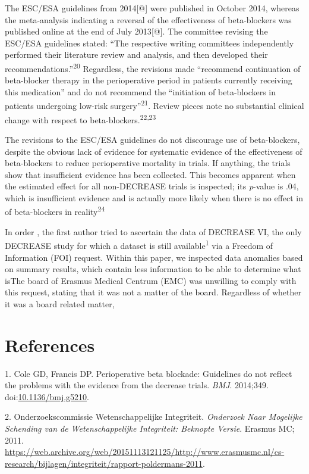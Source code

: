 \documentclass[]{article}
\begin{document}
The ESC/ESA guidelines from 2014{[}@{]} were published in October 2014,
whereas the meta-analysis indicating a reversal of the effectiveness of
beta-blockers was published online at the end of July 2013{[}@{]}. The
committee revising the ESC/ESA guidelines stated: ``The respective
writing committees independently performed their literature review and
analysis, and then developed their
recommendations.''\textsuperscript{20} Regardless, the revisions made
``recommend continuation of beta-blocker therapy in the perioperative
period in patients currently receiving this medication'' and do not
recommend the ``initiation of beta-blockers in patients undergoing
low-risk surgery''\textsuperscript{21}. Review pieces note no
substantial clinical change with respect to
beta-blockers.\textsuperscript{22,23}

The revisions to the ESC/ESA guidelines do not discourage use of
beta-blockers, despite the obvious lack of evidence for systematic
evidence of the effectiveness of beta-blockers to reduce perioperative
mortality in trials. If anything, the trials show that insufficient
evidence has been collected. This becomes apparent when the estimated
effect for all non-DECREASE trials is inspected; its \emph{p}-value is
.04, which is insufficient evidence and is actually more likely when
there is no effect in of beta-blockers in reality\textsuperscript{24}

In order , the first author tried to ascertain the data of DECREASE VI,
the only DECREASE study for which a dataset is still
available\textsuperscript{1} via a Freedom of Information (FOI) request.
Within this paper, we inspected data anomalies based on summary results,
which contain less information to be able to determine what isThe board
of Erasmus Medical Centrum (EMC) was unwilling to comply with this
request, stating that it was not a matter of the board. Regardless of
whether it was a board related matter,

\section*{References}\label{references}

\hypertarget{refs}{}
\hypertarget{ref-Coleg5210}{}
1. Cole GD, Francis DP. Perioperative beta blockade: Guidelines do not
reflect the problems with the evidence from the decrease trials.
\emph{BMJ}. 2014;349.
doi:\href{https://doi.org/10.1136/bmj.g5210}{10.1136/bmj.g5210}.

\hypertarget{ref-commissie2011}{}
2. Onderzoekscommissie Wetenschappelijke Integriteit. \emph{Onderzoek
Naar Mogelijke Schending van de Wetenschappelijke Integriteit: Beknopte
Versie}. Erasmus MC; 2011.
\url{https://web.archive.org/web/20151113121125/http://www.erasmusmc.nl/cs-research/bijlagen/integriteit/rapport-poldermans-2011}.
\end{document}
